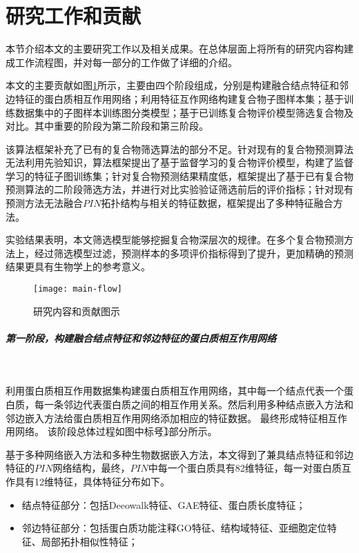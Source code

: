\section{研究工作和贡献}
\label{section:intro:workandresult}

本节介绍本文的主要研究工作以及相关成果。在总体层面上将所有的研究内容构建成工作流程图，并对每一部分的工作做了详细的介绍。

本文的主要贡献如图\ref{fig:main-flow}所示，主要由四个阶段组成，分别是构建融合结点特征和邻边特征的蛋白质相互作用网络；利用特征互作网络构建复合物子图样本集；基于训练数据集中的子图样本训练图分类模型；基于已训练复合物评价模型筛选复合物及对比。其中重要的阶段为第二阶段和第三阶段。

该算法框架补充了已有的复合物筛选算法的部分不足。针对现有的复合物预测算法无法利用先验知识，算法框架提出了基于监督学习的复合物评价模型，构建了监督学习的特征子图训练集；针对复合物预测结果精度低，框架提出了基于已有复合物预测算法的二阶段筛选方法，并进行对比实验验证筛选前后的评价指标；针对现有预测方法无法融合$PIN$拓扑结构与相关的特征数据，框架提出了多种特征融合方法。

实验结果表明，本文筛选模型能够挖掘复合物深层次的规律。在多个复合物预测方法上，经过筛选模型过滤，预测样本的多项评价指标得到了提升，更加精确的预测结果更具有生物学上的参考意义。

\begin{figure}[htbp]
  \centering
  \texttt{[image: main-flow]}
  \caption{研究内容和贡献图示}
  \label{fig:main-flow}
\end{figure}

\subparagraph*{第一阶段，构建融合结点特征和邻边特征的蛋白质相互作用网络} ~

利用蛋白质相互作用数据集构建蛋白质相互作用网络，其中每一个结点代表一个蛋白质，每一条邻边代表蛋白质之间的相互作用关系。然后利用多种结点嵌入方法和邻边嵌入方法给蛋白质相互作用网络添加相应的特征数据。
最终形成特征相互作用网络。
该阶段总体过程如图中标号\textcircled{1}部分所示。

基于多种网络嵌入方法和多种生物数据嵌入方法，本文得到了兼具结点特征和邻边特征的$PIN$网络结构，最终，$PIN$中每一个蛋白质具有82维特征，每一对蛋白质互作具有12维特征，具体特征分布如下。
\begin{itemize}
  \item 结点特征部分：包括Deeowalk特征、GAE特征、蛋白质长度特征；
  \item 邻边特征部分：包括蛋白质功能注释GO特征、结构域特征、亚细胞定位特征、局部拓扑相似性特征；
\end{itemize}

